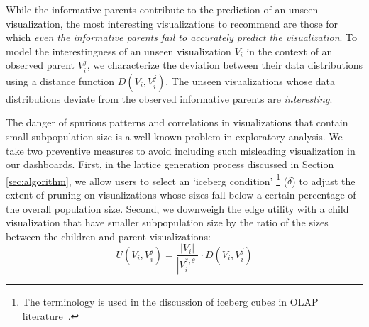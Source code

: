  While the informative parents contribute to the prediction of an unseen visualization, the most interesting visualizations to recommend are those for which \emph{even the informative parents fail to accurately predict the visualization}.  To model the interestingness of an unseen visualization $V_i$ in the context of an observed parent $V_i^j$, we characterize the deviation between their data distributions using a distance function $D(V_i, V_i^j)$. The unseen visualizations whose data distributions deviate from the observed informative parents are \emph{interesting}.  

 The danger of spurious patterns and correlations in visualizations that contain small subpopulation size is a well-known problem in exploratory analysis\cite{Binnig2017}. We take two preventive measures to avoid including such misleading visualization in our dashboards. First, in the lattice generation process discussed in Section \ref{sec:algorithm}, we allow users to select an `iceberg condition' \footnote{The terminology is used in the discussion of iceberg cubes in OLAP literature~\cite{Xin2007}.} ($\delta$) to adjust the extent of pruning on visualizations whose sizes fall below a certain percentage of the overall population size. Second, we downweigh the edge utility with a child visualization that have smaller subpopulation size by the ratio of the sizes between the children and parent visualizations: 
\begin{equation}
    U(V_i, V_i^j) = \frac{|V_i|}{|V_i^{*, \theta}|} \cdot D(V_i, V_i^j)
    \label{edge_utility}
\end{equation}
